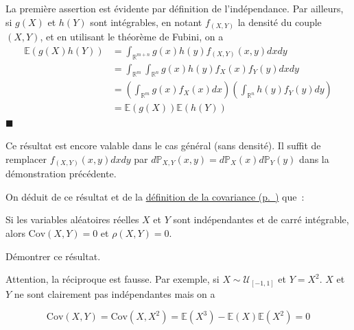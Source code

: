 \begin{preuve}
La première assertion est évidente par définition de l'indépendance. Par
ailleurs, si \(g(X)\) et \(h(Y)\) sont intégrables, en notant
\(f_{(X,Y)}\) la densité du couple \((X,Y)\), et en utilisant le
théorème de Fubini, on a \begin{align*}
\mathbb{E}(g(X)h(Y))  & = \int_{\mathbb{R}^{m+n}} g(x)h(y) f_{(X,Y)}(x,y) dx dy \\
                & = \int_{\mathbb{R}^m} \int_{\mathbb{R}^n} g(x)h(y)f_X(x) f_Y(y) dx dy \\
                & = \left(\int_{\mathbb{R}^m}  g(x) f_X(x) dx \right) \left(\int_{\mathbb{R}^n} h(y) f_Y(y) dy\right)\\
                & = \mathbb{E}(g(X))\mathbb{E}(h(Y))
\end{align*}\hfill$\blacksquare$
\end{preuve}

\begin{remarque}\label{II-cas-guxe9nuxe9ral}

Ce résultat est encore valable dans le cas général (sans densité). Il
suffit de remplacer \(f_{(X,Y)}(x,y) dx dy\) par
\(d\mathbb{P}_{X,Y}(x,y) = d\mathbb{P}_X(x)d\mathbb{P}_Y(y)\) dans la
démonstration précédente.

On déduit de ce résultat et de la
\protect\hyperref[II-defcov]{définition de la
covariance (p.~\pageref*{II-defcov})} que~:
\end{remarque}

\begin{corollaire}\label{II-covariance-de-variables-aluxe9atoires-induxe9pendantes}

Si les variables aléatoires réelles \(X\) et \(Y\) sont indépendantes et
de carré intégrable, alors \(\text{Cov}(X,Y) = 0\) et \(\rho(X,Y) = 0\).
\end{corollaire}

\label{II-demo-cov-indep}
Démontrer ce résultat.

\begin{remarque}\label{II-cas-reciproque}

Attention, la réciproque est fausse. Par exemple, si
\(X \sim \mathcal{U}_{[-1,1]}\) et \(Y = X^2\). \(X\) et \(Y\) ne sont
clairement pas indépendantes mais on a

\[\text{Cov}(X,Y) = \text{Cov}(X,X^2) = \mathbb{E}(X^3) - \mathbb{E}(X)\mathbb{E}(X^2) = 0\]
\end{remarque}

